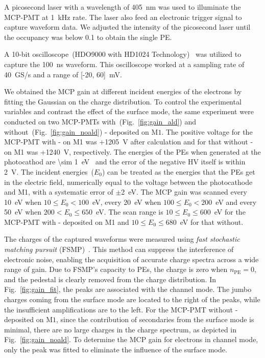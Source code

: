 A picosecond laser with a wavelength of \SI{405}{nm} was used to illuminate the MCP-PMT at \SI{1}{kHz} rate. The laser also feed an electronic trigger signal to capture waveform data.
We adjusted the intensity of the picosecond laser until the occupancy was below 0.1 to obtain the single PE.

A 10-bit oscilloscope~(HDO9000 with HD1024 Technology)~\cite{teledynelecroy} was utilized to capture the \SI{100}{ns} waveform. This oscilloscope worked at a sampling rate of \SI{40}{GS/s} and a range of [-20, 60]~\si{mV}.

We obtained the MCP gain at different incident energies of the electrons by fitting the Gaussian on the charge distribution. To control the experimental variables and contrast the effect of the surface mode, the same experiment were conducted on two MCP-PMTs with~(Fig.~\ref{fig:gain_ald}) and without~(Fig.~\ref{fig:gain_noald}) - deposited on $\mathrm{M}1$.
The positive voltage for the MCP-PMT with - on M1 was +\SI{1205}{V} after calculation and for that without - on M1 was +\SI{1240}{V}, respectively.
The energies of the PEs when generated at the photocathod are \SI{\sim 1}{eV}~\cite{Nathan1970TheED} and the error of the negative HV itself is within \SI{2}{V}.
The incident energies~($E_0$) can be treated as the energies that the PEs get in the electric field, numerically equal to the voltage between the photocathode and M1, with a systematic error of $\pm$\SI{2}{eV}.
The MCP gain was scanned every \SI{10}{eV} when $10\leqslant E_0<100$~\si{eV}, every \SI{20}{eV} when $100\leqslant E_0<200$~\si{eV}
and every \SI{50}{eV} when $200<E_0\leqslant 650$~\si{eV}.
The scan range is $10\leqslant E_0\leqslant 600$~\si{eV} for the MCP-PMT with - deposited on M1 and $10\leqslant E_0\leqslant 680$~\si{eV} for that without.

The charges of the captured waveforms were measured using \emph{fast stochastic matching pursuit} (FSMP)~\cite{Xu_2022,Wang_2024}. This method can suppress the interference of electronic noise, enabling the acquisition of accurate charge spectra across a wide range of gain. Due to FSMP's capacity to PEs, the charge is zero when $n_{\mathrm{PE}} = 0$, and the pedestal is clearly removed from the charge distribution.
In Fig.~\ref{fig:gain_fit}, the peaks are associated with the channel mode. The jumbo charges coming from the surface mode are located to the right of the peaks, while the insufficient amplifications are to the left. For the MCP-PMT without - deposited on $\mathrm{M}1$, since the contribution of secondaries from the surface mode is minimal, there are no large charges in the charge spectrum, as depicted in Fig.~\ref{fig:gain_noald}. To determine the MCP gain for electrons in channel mode, only the peak was fitted to eliminate the influence of the surface mode.

